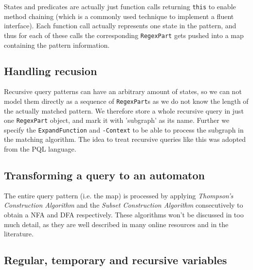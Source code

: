 States and predicates are actually just function calls returning \texttt{this} to enable method chaining (which is a commonly used technique to implement a fluent interface). Each function call actually represents one state in the pattern, and thus for each of these calls the corresponding \texttt{RegexPart} gets pushed into a map containing the pattern information. 

\subsection*{Handling recusion}

 Recursive query patterns can have an arbitrary amount of states, so we can not model them directly as a sequence of \texttt{RegexPart}s as we do not know the length of the actually matched pattern. We therefore store a whole recursive query in just one \texttt{RegexPart} object, and mark it with 'subgraph' as its name. Further we specify the \texttt{ExpandFunction} and \texttt{-Context} to be able to process the subgraph in the matching algorithm. The idea to treat recursive queries like this was adopted from the PQL language\cite{PQL}. 

\subsection*{Transforming a query to an automaton}

The entire query pattern (i.e. the map) is processed by applying \textit{Thompson's Construction Algorithm} and the \textit{Subset Construction Algorithm} consecutively to obtain a NFA and DFA respectively. These algorithms won't be discussed in too much detail, as they are well described in many online resources and in the literature\cite{Thompson}. 

\subsection*{Regular, temporary and recursive variables}

